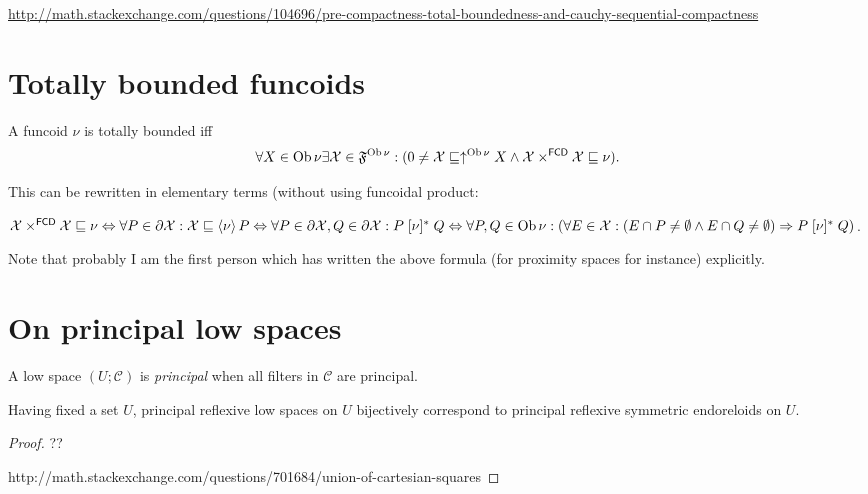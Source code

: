 \url{http://math.stackexchange.com/questions/104696/pre-compactness-total-boundedness-and-cauchy-sequential-compactness}

\section{Totally bounded funcoids}

\begin{defn}
  A funcoid $\nu$ is totally bounded iff
  \[ \forall X \in \operatorname{Ob} \nu \exists \mathcal{X} \in
     \mathfrak{F}^{\operatorname{Ob} \nu} : (0 \neq \mathcal{X} \sqsubseteq
     \uparrow^{\operatorname{Ob} \nu} X \wedge \mathcal{X}
     \times^{\mathsf{FCD}} \mathcal{X} \sqsubseteq \nu) . \]
\end{defn}

This can be rewritten in elementary terms (without using funcoidal product:

$\mathcal{X} \times^{\mathsf{FCD}} \mathcal{X} \sqsubseteq \nu
\Leftrightarrow \forall P \in \partial \mathcal{X} : \mathcal{X} \sqsubseteq
\left\langle \nu\right\rangle P \Leftrightarrow \forall P \in \partial \mathcal{X}, Q
\in \partial \mathcal{X} : P \mathrel{[\nu]^{\ast}} Q \Leftrightarrow \forall
P, Q \in \operatorname{Ob} \nu : \left( \forall E \in \mathcal{X} : (E \cap P \neq
\emptyset \wedge E \cap Q \neq \emptyset) \Rightarrow P \mathrel{[\nu]^{\ast}}
Q \right)$.

Note that probably I am the first person which has written the above formula
(for proximity spaces for instance) explicitly.

\section{On principal low spaces}

\begin{defn}
  A low space $\left( U ; \mathscr{C} \right)$ is \emph{principal}
  when all filters in $\mathscr{C}$ are principal.
\end{defn}

\begin{prop}
  Having fixed a set $U$, principal reflexive low spaces on $U$
  bijectively correspond to principal reflexive symmetric endoreloids on $U$.
\end{prop}

\begin{proof}
  ??
  
  http://math.stackexchange.com/questions/701684/union-of-cartesian-squares
\end{proof}

